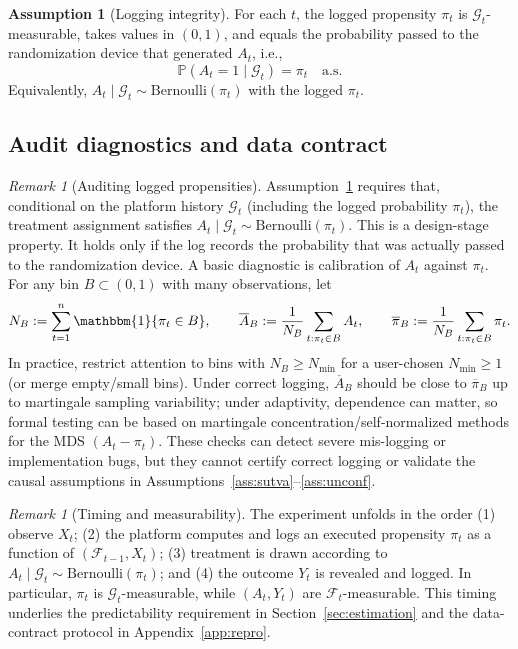 \documentclass[11pt]{article}
\numberwithin{equation}{section}
\theoremstyle{plain}
\theoremstyle{definition}
\newtheorem{assumption}[theorem]{Assumption}
\theoremstyle{remark}
\newtheorem{remark}[theorem]{Remark}
\newcommand{\Pp}{\mathbb{P}}
\newcommand{\ind}[1]{\mathbbm{1}\{#1\}}
\newcommand{\cF}{\mathcal{F}}
\newcommand{\cG}{\mathcal{G}}
\begin{document}
\begin{assumption}[Logging integrity]\label{ass:logging_integrity}
For each $t$, the logged propensity $\pi_t$ is $\cG_t$-measurable, takes values in $(0,1)$, and equals the probability passed to the randomization device that generated $A_t$, i.e.,
\[
\Pp(A_t=1\mid \cG_t)=\pi_t \quad \text{a.s.}
\]
Equivalently, $A_t\mid \cG_t\sim \mathrm{Bernoulli}(\pi_t)$ with the logged $\pi_t$.
\end{assumption}

\subsection{Audit diagnostics and data contract}\label{sec:audit}

\begin{remark}[Auditing logged propensities]\label{rem:logging_audit}
Assumption~\ref{ass:logging_integrity} requires that, conditional on the platform history $\cG_t$ (including the logged probability $\pi_t$), the treatment assignment satisfies $A_t\mid \cG_t \sim \mathrm{Bernoulli}(\pi_t)$. This is a design-stage property. It holds only if the log records the probability that was actually passed to the randomization device.
A basic diagnostic is calibration of $A_t$ against $\pi_t$. For any bin $B\subset(0,1)$ with many observations, let
\[
N_B:=\sum_{t=1}^n \ind{\pi_t\in B},\qquad
\overline A_B:=\frac{1}{N_B}\sum_{t:\pi_t\in B} A_t,\qquad
\overline \pi_B:=\frac{1}{N_B}\sum_{t:\pi_t\in B} \pi_t.
\]
In practice, restrict attention to bins with $N_B\ge N_{\min}$ for a user-chosen $N_{\min}\ge 1$ (or merge empty/small bins).
Under correct logging, $\overline A_B$ should be close to $\overline \pi_B$ up to martingale sampling variability; under adaptivity, dependence can matter, so formal testing can be based on martingale concentration/self-normalized methods for the MDS $(A_t-\pi_t)$. These checks can detect severe mis-logging or implementation bugs, but they cannot certify correct logging or validate the causal assumptions in Assumptions~\ref{ass:sutva}--\ref{ass:unconf}.
\end{remark}

\begin{remark}[Timing and measurability]\label{rem:timing}
The experiment unfolds in the order (1) observe $X_t$; (2) the platform computes and logs an executed propensity $\pi_t$ as a function of $(\cF_{t-1},X_t)$; (3) treatment is drawn according to $A_t\mid \cG_t\sim\mathrm{Bernoulli}(\pi_t)$; and (4) the outcome $Y_t$ is revealed and logged. In particular, $\pi_t$ is $\cG_t$-measurable, while $(A_t,Y_t)$ are $\cF_t$-measurable.
This timing underlies the predictability requirement in Section~\ref{sec:estimation} and the data-contract protocol in Appendix~\ref{app:repro}.
\end{remark}
\end{document}

